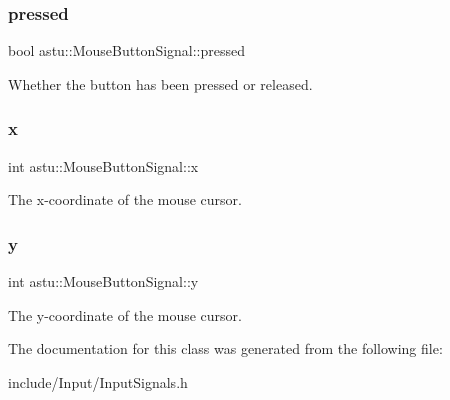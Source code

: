 \subsubsection{\texorpdfstring{pressed}{pressed}}
{\footnotesize\ttfamily bool astu\+::\+Mouse\+Button\+Signal\+::pressed}

Whether the button has been pressed or released. \mbox{\label{classastu_1_1MouseButtonSignal_ae6ecc707c5ea1b1c4a85f225a6110e56}} 
\subsubsection{\texorpdfstring{x}{x}}
{\footnotesize\ttfamily int astu\+::\+Mouse\+Button\+Signal\+::x}

The x-\/coordinate of the mouse cursor. \mbox{\label{classastu_1_1MouseButtonSignal_adae8e9d0d9bee2565248f90bde89bbd2}} 
\subsubsection{\texorpdfstring{y}{y}}
{\footnotesize\ttfamily int astu\+::\+Mouse\+Button\+Signal\+::y}

The y-\/coordinate of the mouse cursor. 

The documentation for this class was generated from the following file\+:\begin{DoxyCompactItemize}
\item 
include/\+Input/Input\+Signals.\+h\end{DoxyCompactItemize}
